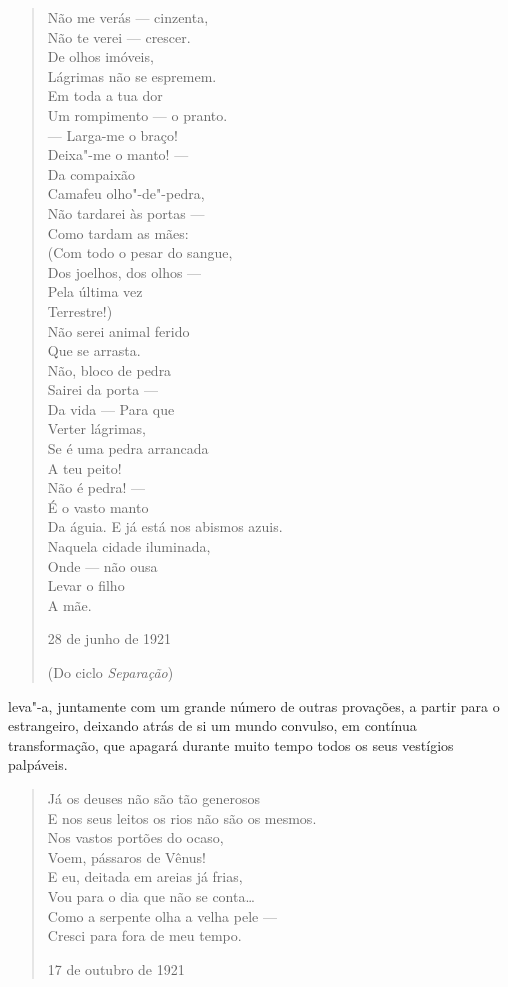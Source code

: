 \begin{verse}
Não me verás --- cinzenta, \\
Não te verei --- crescer. \\
De olhos imóveis, \\
Lágrimas não se espremem. \\[8pt]
Em toda a tua dor \\
Um rompimento --- o pranto. \\
--- Larga-me o braço! \\
Deixa"-me o manto! --- \\[8pt]
Da compaixão \\
Camafeu olho"-de"-pedra, \\
Não tardarei às portas --- \\
Como tardam as mães: \\[8pt]
(Com todo o pesar do sangue, \\
Dos joelhos, dos olhos --- \\
Pela última vez \\
Terrestre!) \\
Não serei animal ferido \\
Que se arrasta. \\[8pt]
Não, bloco de pedra \\
Sairei da porta --- \\
Da vida --- Para que \\
Verter lágrimas, \\
Se é uma pedra arrancada \\
A teu peito! \\[8pt]
Não é pedra! --- \\
É o vasto manto \\
Da águia. E já está nos abismos azuis. \\
Naquela cidade iluminada, \\
Onde --- não ousa \\
Levar o filho \\
A mãe.

28 de junho de 1921

(Do ciclo \emph{Separação})

\end{verse}

\noindent{}leva"-a, juntamente com um grande número de outras provações, a
partir para o estrangeiro, deixando atrás de si um mundo convulso,
em contínua transformação, que apagará durante muito tempo todos os
seus vestígios palpáveis.

\begin{verse}
Já os deuses não são tão generosos \\
E nos seus leitos os rios não são os mesmos. \\
Nos vastos portões do ocaso, \\
Voem, pássaros de Vênus! \\[8pt]
E eu, deitada em areias já frias, \\
Vou para o dia que não se conta\ldots{} \\
Como a serpente olha a velha pele --- \\
Cresci para fora de meu tempo. 

17 de outubro de 1921

\end{verse}

